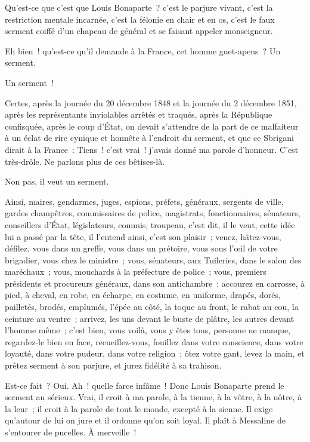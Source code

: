 \documentclass[french,twoside]{book} %
\begin{document}
\noindent Qu’est-ce que c’est que Louis Bonaparte ? c’est le parjure vivant, c’est la restriction mentale incarnée, c’est la félonie en chair et en os, c’est le faux serment coiffé d’un chapeau de général et se faisant appeler monseigneur.\par
Eh bien ! qu’est-ce qu’il demande à la France, cet homme guet-apens ? Un serment.\par
Un serment !\par
Certes, après la journée du 20 décembre 1848 et la journée du 2 décembre 1851, après les représentants inviolables arrêtés et traqués, après la République confisquée, après le coup d’État, on devait s’attendre de la part de ce malfaiteur à un éclat de rire cynique et honnête à l’endroit du serment, et que ce Sbrigani dirait à la France : Tiens ! c’est vrai ! j’avais donné ma parole d’honneur. C’est très-drôle. Ne parlons plus de ces bêtises-là.\par
Non pas, il veut un serment.\par
Ainsi, maires, gendarmes, juges, espions, préfets, généraux, sergents de ville, gardes champêtres, commissaires de police, magistrats, fonctionnaires, sénateurs, conseillers d’État, législateurs, commis, troupeau, c’est dit, il le veut, cette idée lui a passé par la tête, il l’entend ainsi, c’est son plaisir ; venez, hâtez-vous, défilez, vous dans un greffe, vous dans un prétoire, vous sous l’œil de votre brigadier, vous chez le ministre ; vous, sénateurs, aux Tuileries, dans le salon des maréchaux ; vous, mouchards à la préfecture de police ; vous, premiers présidents et procureurs généraux, dans son antichambre ; accourez en carrosse, à pied, à cheval, en robe, en écharpe, en costume, en uniforme, drapés, dorés, pailletés, brodés, emplumés, l’épée au côté, la toque au front, le rabat au cou, la ceinture au ventre ; arrivez, les uns devant le buste de plâtre, les autres devant l’homme même ; c’est bien, vous voilà, vous y êtes tous, personne ne manque, regardez-le bien en face, recueillez-vous, fouillez dans votre conscience, dans votre loyauté, dans votre pudeur, dans votre religion ; ôtez votre gant, levez la main, et prêtez serment à son parjure, et jurez fidélité à sa trahison.\par
Est-ce fait ? Oui. Ah ! quelle farce infâme ! Donc Louis Bonaparte prend le serment au sérieux. Vrai, il croit à ma parole, à la tienne, à la vôtre, à la nôtre, à la leur ; il croit à la parole de tout le monde, excepté à la sienne. Il exige qu’autour de lui on jure et il ordonne qu’on soit loyal. Il plaît à Messaline de s’entourer de pucelles. À merveille !\par
\end{document}
